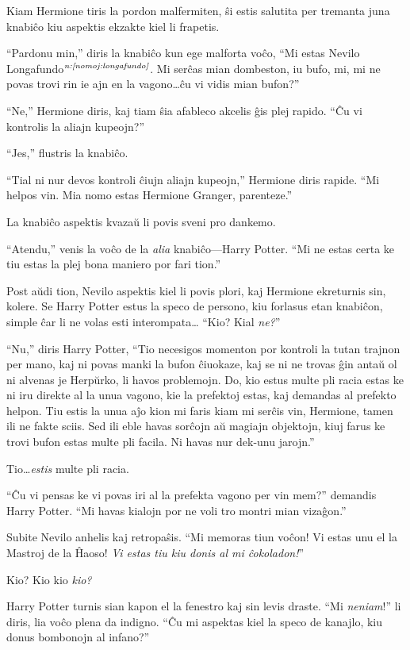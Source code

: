 Kiam Hermione tiris la pordon malfermiten, ŝi estis salutita per
tremanta juna knabiĉo kiu aspektis ekzakte kiel li frapetis.

``Pardonu min,'' diris la knabiĉo kun ege malforta voĉo, ``Mi estas
Nevilo Longafundo$^{\textit{n:\ref{nomoj:longafundo}}}$. Mi serĉas mian dombeston, iu
bufo, mi, mi ne povas trovi rin ie ajn en la vagono\ldots ĉu vi vidis
mian bufon?''

``Ne,'' Hermione diris, kaj tiam ŝia afableco akcelis ĝis plej
rapido. ``Ĉu vi kontrolis la aliajn kupeojn?''

``Jes,'' flustris la knabiĉo.

``Tial ni nur devos kontroli ĉiujn aliajn kupeojn,'' Hermione diris
rapide. ``Mi helpos vin. Mia nomo estas Hermione Granger, parenteze.''

La knabiĉo aspektis kvazaŭ li povis sveni pro dankemo.

``Atendu,'' venis la voĉo de la \emph{alia} knabiĉo—Harry Potter. ``Mi
ne estas certa ke tiu estas la plej bona maniero por fari tion.''

Post aŭdi tion, Nevilo aspektis kiel li povis plori, kaj Hermione
ekreturnis sin, kolere. Se Harry Potter estus la speco de persono, kiu
forlasus etan knabiĉon, simple ĉar li ne volas esti interompata\ldots
``Kio? Kial \emph{ne?}''

``Nu,'' diris Harry Potter, ``Tio necesigos momenton por kontroli la
tutan trajnon per mano, kaj ni povas manki la bufon ĉiuokaze, kaj se
ni ne trovas ĝin antaŭ ol ni alvenas je Herpŭrko, li havos
problemojn. Do, kio estus multe pli racia estas ke ni iru direkte al
la unua vagono, kie la prefektoj estas, kaj demandas al prefekto
helpon. Tiu estis la unua aĵo kion mi faris kiam mi serĉis vin,
Hermione, tamen ili ne fakte sciis. Sed ili eble havas sorĉojn aŭ
magiajn objektojn, kiuj farus ke trovi bufon estas multe pli
facila. Ni havas nur dek-unu jarojn.''


Tio\ldots \emph{estis} multe pli racia.

``Ĉu vi pensas ke vi povas iri al la prefekta vagono per vin mem?''
demandis Harry Potter. ``Mi havas kialojn por ne voli tro montri mian
vizaĝon.''

Subite Nevilo anhelis kaj retropaŝis. ``Mi memoras tiun voĉon! Vi
estas unu el la Mastroj de la Ĥaoso! \emph{Vi estas tiu kiu donis al
  mi ĉokoladon!}''

Kio? Kio kio \emph{kio?}

Harry Potter turnis sian kapon el la fenestro kaj sin levis
draste. ``Mi \emph{neniam}!'' li diris, lia voĉo plena da
indigno. ``Ĉu mi aspektas kiel la speco de kanajlo, kiu donus
bombonojn al infano?''

